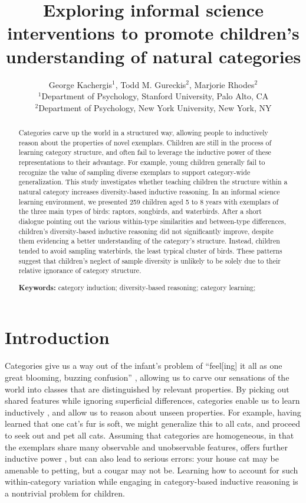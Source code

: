 \documentclass[10pt,letterpaper]{article}
\title{Exploring informal science interventions to promote children's understanding of natural categories}
\author{George Kachergis$^1$, Todd M. Gureckis$^2$, Marjorie Rhodes$^2$ \\
     $^1$Department of Psychology, Stanford University, Palo Alto, CA \\
     $^2$Department of Psychology, New York University, New York, NY \\
  }
\begin{document}
\maketitle

\begin{abstract}
Categories carve up the world in a structured way, allowing people to inductively reason about the properties of novel exemplars. 
Children are still in the process of learning category structure, and often fail to leverage the inductive power of these representations to their advantage.
For example, young children generally fail to recognize the value of sampling diverse exemplars to support category-wide generalization.
This study investigates whether teaching children the structure within a natural category increases diversity-based inductive reasoning.
In an informal science learning environment, we presented 259 children aged 5 to 8 years with exemplars of the three main types of birds: raptors, songbirds, and waterbirds.
After a short dialogue pointing out the various within-type similarities and between-type differences, children's diversity-based inductive reasoning did not significantly improve, despite them evidencing a better understanding of the category's structure. 
Instead, children tended to avoid sampling waterbirds, the least typical cluster of birds. 
These patterns suggest that children's neglect of sample diversity is unlikely to be solely due to their relative ignorance of category structure.


\textbf{Keywords:} 
category induction; diversity-based reasoning; category learning; 
\end{abstract}

\section{Introduction} 

Categories give us a way out of the infant's problem of ``feel[ing] it all as one great blooming, buzzing confusion'' \cite{James:1890}, allowing us to carve our sensations of the world into classes that are distinguished by relevant properties. 
By picking out shared features while ignoring superficial differences, categories enable us to learn inductively \cite{Rips:1975}, and allow us to reason about unseen properties. 
For example, having learned that one cat's fur is soft, we might generalize this to all cats, and proceed to seek out and pet all cats. 
Assuming that categories are homogeneous, in that the exemplars share many observable and unobservable features, offers further inductive power \cite{Gelman:1988}, but can also lead to serious errors: your house cat may be amenable to petting, but a cougar may not be. 
Learning how to account for such within-category variation while engaging in category-based inductive reasoning is a nontrivial problem for children.
\end{document}
